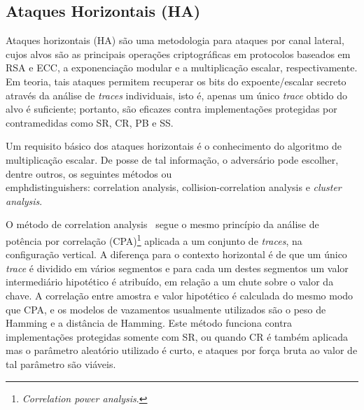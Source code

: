 \documentclass{SBCbookchapter}
\begin{document}


\subsection{Ataques Horizontais (HA)}

Ataques horizontais (HA) são uma metodologia para ataques por canal lateral, cujos alvos são as principais operações criptográficas em protocolos baseados em RSA e ECC, a exponenciação modular e a multiplicação escalar, respectivamente. Em teoria, tais ataques permitem recuperar os bits do expoente/escalar secreto através da análise de \emph{traces} individuais, isto é, apenas um único \emph{trace} obtido do alvo é suficiente; portanto, são eficazes contra implementações protegidas por contramedidas como SR, CR, PB e SS.

Um requisito básico dos ataques horizontais é o conhecimento do algoritmo de multiplicação escalar. De posse de tal informação, o adversário pode escolher, dentre outros, os seguintes métodos ou \\emph{distinguishers: correlation analysis, collision-correlation analysis} e \emph{cluster analysis}.     %

O método de correlation analysis~\cite{Clavier2010} segue o mesmo princípio da análise de potência por correlação (CPA)\footnote{\textit{Correlation power analysis}.} aplicada a um conjunto de \emph{traces}, na configuração vertical. A diferença para o contexto horizontal é de que um único \emph{trace} é dividido em vários segmentos e para cada um destes segmentos um valor intermediário hipotético é atribuído, em relação a um chute sobre o valor da chave. A correlação entre amostra e valor hipotético é calculada do mesmo modo que CPA, e os modelos de vazamentos usualmente utilizados são o peso de Hamming e a distância de Hamming. Este método funciona contra implementações protegidas somente com SR, ou quando CR é também aplicada mas o parâmetro aleatório utilizado é curto, e ataques por força bruta ao valor de tal parâmetro são viáveis.
\end{document}
